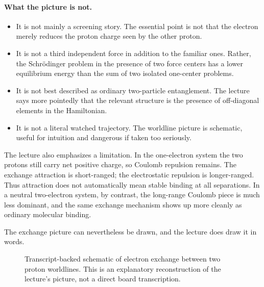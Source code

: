 \paragraph{What the picture is not.}
\begin{itemize}
\item It is not mainly a screening story. The essential point is not that the electron merely reduces the proton charge seen by the other proton.
\item It is not a third independent force in addition to the familiar ones. Rather, the Schr\"odinger problem in the presence of two force centers has a lower equilibrium energy than the sum of two isolated one-center problems.
\item It is not best described as ordinary two-particle entanglement. The lecture says more pointedly that the relevant structure is the presence of off-diagonal elements in the Hamiltonian.
\item It is not a literal watched trajectory. The worldline picture is schematic, useful for intuition and dangerous if taken too seriously.
\end{itemize}

The lecture also emphasizes a limitation. In the one-electron system the two protons still carry net positive charge, so Coulomb repulsion remains. The exchange attraction is short-ranged; the electrostatic repulsion is longer-ranged. Thus attraction does not automatically mean stable binding at all separations. In a neutral two-electron system, by contrast, the long-range Coulomb piece is much less dominant, and the same exchange mechanism shows up more cleanly as ordinary molecular binding.

The exchange picture can nevertheless be drawn, and the lecture does draw it in words.

\begin{figure}[h]
\centering
{}
\caption{Transcript-backed schematic of electron exchange between two proton worldlines. This is an explanatory reconstruction of the lecture's picture, not a direct board transcription.}
\end{figure}

